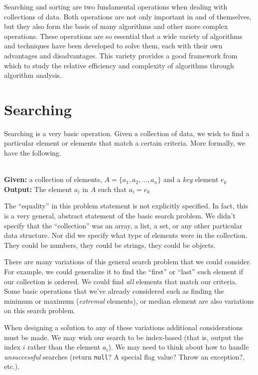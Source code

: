 

Searching and sorting are two fundamental operations when dealing
with collections of data.  Both operations are not only important in
and of themselves, but they also form the basis of many algorithms
and other more complex operations.  These operations are so essential 
that a wide variety
of algorithms and techniques have been developed to solve them, each
with their own advantages and disadvantages.  This variety provides
a good framework from which to study the relative efficiency and complexity
of algorithms through algorithm analysis.

\section{Searching}

Searching is a very basic operation.  Given a collection of data, we
wish to find a particular element or elements that match a certain 
criteria.  More formally, we have the following.

\begin{problem}[Searching]
\label{problem:searching}
~\\
\textbf{Given:} a collection of elements, $A =\{a_1, a_2, \ldots, a_n\}$ 
and a \emph{key} element $e_k$\\
\textbf{Output:} The element $a_i$ in $A$ such that $a_i = e_k$
\end{problem}

The ``equality'' in this problem statement is not explicitly 
specified.  In 
fact, this is a very general, abstract statement of the basic search 
problem.  We didn't specify that the ``collection'' was an array, a list, 
a set, or any other particular data structure.  Nor did we specify what
type of elements were in the collection.  They could be numbers, they
could be strings, they could be objects.  

There are many variations of this general search problem that we could
consider.  For example, we could generalize it to find the ``first''
or ``last'' such element if our collection is ordered.  We could find
\emph{all} elements that match our criteria.  Some basic operations that 
we've already considered such as finding the minimum or maximum
(\emph{extremal} elements), or median element are also variations on this search 
problem.

When designing a solution to any of these variations additional 
considerations must be made.  We may wish our search to be index-based 
(that is, output the index $i$ rather than the element $a_i$).  We
may need to think about how to handle \emph{unsuccessful} searches 
(return \texttt{null}?  A special flag value?  Throw an
exception?, etc.).

